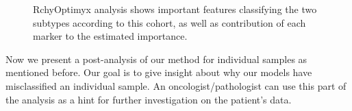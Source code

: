 \begin{figure}[!ht]
  \caption{RchyOptimyx analysis shows important features classifying the two subtypes according to this cohort, as well as contribution of each marker to the estimated importance.}
  \label{fig:fcs-qa-rchy1}
\end{figure}

Now we present a post-analysis of our method for individual samples as mentioned before. Our goal is to give insight about why our models have misclassified an individual sample. An oncologist/pathologist can use this part of the analysis as a hint for further investigation on the patient's data.

